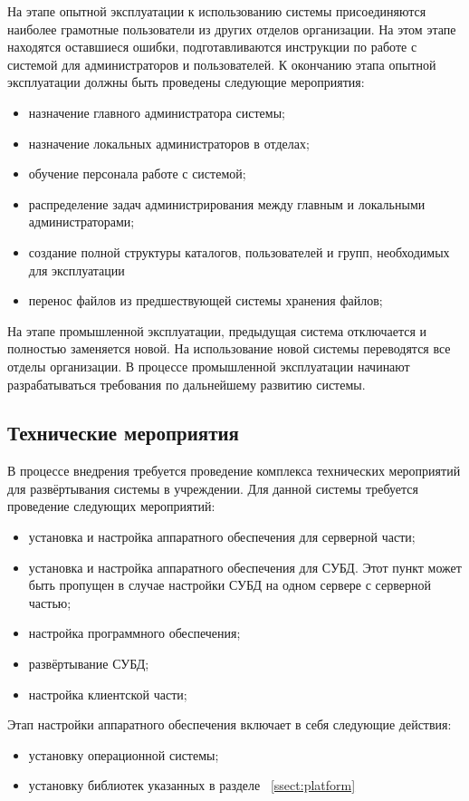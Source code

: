 \documentclass[utf8,usehyperref,12pt]{G7-32}
\begin{document}
На этапе опытной эксплуатации к использованию системы присоединяются наиболее грамотные пользователи из других отделов организации. На этом этапе находятся оставшиеся ошибки, подготавливаются инструкции по работе с системой для администраторов и пользователей. К окончанию этапа опытной эксплуатации должны быть проведены следующие мероприятия:

\begin{itemize}
 \item назначение главного администратора системы;
 \item назначение локальных администраторов в отделах;
 \item обучение персонала работе с системой;
 \item распределение задач администрирования между главным и локальными администраторами;
 \item создание полной структуры каталогов, пользователей и групп, необходимых для эксплуатации
 \item перенос файлов из предшествующей системы хранения файлов;
\end{itemize}

На этапе промышленной эксплуатации, предыдущая система отключается и полностью заменяется новой. На использование новой системы переводятся все отделы организации. В процессе промышленной эксплуатации начинают разрабатываться требования по дальнейшему развитию системы.

\subsection{Технические мероприятия}

В процессе внедрения требуется проведение комплекса технических мероприятий для развёртывания системы в учреждении. Для данной системы требуется проведение следующих мероприятий:
\begin{itemize}
 \item установка и настройка аппаратного обеспечения для серверной части;
 \item установка и настройка аппаратного обеспечения для СУБД. Этот пункт может быть пропущен в случае настройки СУБД на одном сервере с серверной частью;
 \item настройка программного обеспечения;
 \item развёртывание СУБД;
 \item настройка клиентской части;
\end{itemize} 

Этап настройки аппаратного обеспечения включает в себя следующие действия:
\begin{itemize}
 \item установку операционной системы;
 \item установку библиотек указанных в разделе ~\ref{ssect:platform}
\end{itemize}
\end{document}
